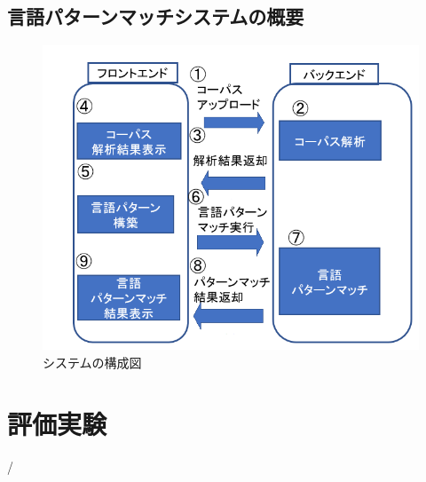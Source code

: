 \documentclass{FITpaper}
\begin{document}
\subsection{言語パターンマッチシステムの概要}
\begin{figure}[htbp]
  \centering
  \includegraphics[scale=0.4]{fig/system_fig.png}
  \caption{システムの構成図}
  \label{fig:sys}
\end{figure}

\section{評価実験}



/%

%
\end{document}
